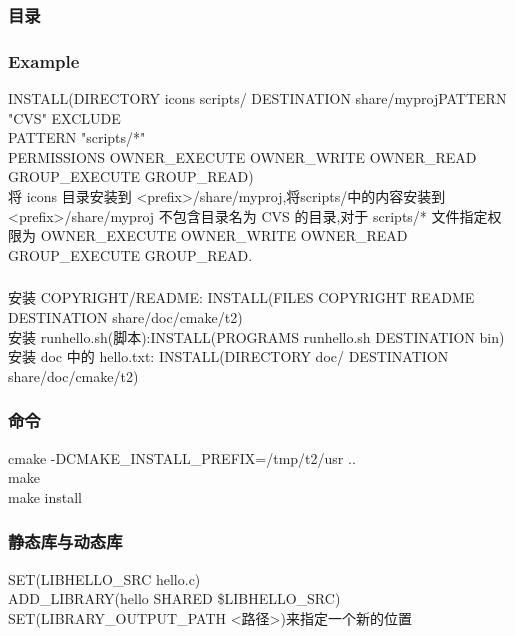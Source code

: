 \documentclass{beamer}
\newcommand{\quotes}[1]{"#1"}
\begin{document}
\begin{CJK}{UTF8}{gkai}
  \begin{frame}\frametitle{目录}
  \end{frame}

  \begin{frame}\frametitle{Example}
    INSTALL(DIRECTORY icons scripts/ DESTINATION share/myprojPATTERN \quotes{CVS} EXCLUDE\\
    PATTERN \quotes{scripts/*}\\
    PERMISSIONS OWNER\_EXECUTE OWNER\_WRITE OWNER\_READ\\
    GROUP\_EXECUTE GROUP\_READ)\\
    将 icons 目录安装到 <prefix>/share/myproj,将scripts/中的内容安装到
    <prefix>/share/myproj 不包含目录名为 CVS 的目录,对于 scripts/* 文件指定权限为 OWNER\_EXECUTE
    OWNER\_WRITE OWNER\_READ GROUP\_EXECUTE GROUP\_READ.
  \end{frame}

  \begin{frame}\frametitle{}
    安装 COPYRIGHT/README: INSTALL(FILES COPYRIGHT README DESTINATION
    share/doc/cmake/t2)\\
    安装 runhello.sh(脚本):INSTALL(PROGRAMS runhello.sh DESTINATION
    bin)\\
    安装 doc 中的 hello.txt: INSTALL(DIRECTORY doc/ DESTINATION
    share/doc/cmake/t2)\\
  \end{frame}

  \begin{frame}\frametitle{命令}
    cmake -DCMAKE\_INSTALL\_PREFIX=/tmp/t2/usr .. \\
    make \\
    make install\\
  \end{frame}

  \begin{frame}\frametitle{静态库与动态库}
    SET(LIBHELLO\_SRC hello.c)\\
    ADD\_LIBRARY(hello SHARED \${LIBHELLO\_SRC})\\
    SET(LIBRARY\_OUTPUT\_PATH <路径>)来指定一个新的位置\\
  \end{frame}


\end{CJK}
\end{document}
